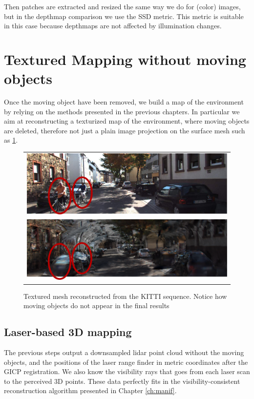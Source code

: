 Then patches are extracted and resized the same way we do for (color) images, but in the depthmap comparison we use the SSD metric. This metric is suitable in this case because depthmaps are not affected by illumination changes.



\section{Textured Mapping without moving objects}
Once the moving object have been removed, we build a map of the environment by relying on the methods presented in the previous chapters.
In particular we aim at reconstructing a texturized map of the environment, where moving objects are deleted, therefore not just a plain image projection on the surface mesh such as \ref{fig:recwithoutmoving}.



\begin{figure}[tp]
 \centering
    \begin{tabular}{c}
    \includegraphics[width=0.98\columnwidth]{./img/ch-laser/originaFrame}\\
    \includegraphics[width=0.98\columnwidth]{./img/ch-laser/texuredRec}\\
 \end{tabular}
 \caption{Textured mesh reconstructed from the KITTI sequence. Notice how moving objects do not appear in the final results}
 \label{fig:recwithoutmoving}
\end{figure}



\subsection{Laser-based 3D mapping}
The previous steps output a downsampled lidar point cloud without the moving objects, and the positions of the laser range finder in metric coordinates after the GICP registration.
We also know the visibility rays that goes from each laser scan to the perceived 3D points. These data perfectly fits in the visibility-consistent reconstruction algorithm presented in Chapter \ref{ch:manif}.

